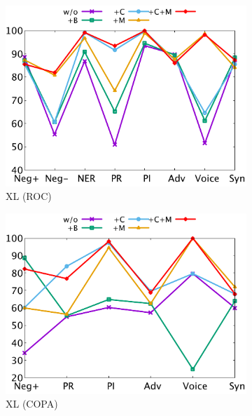\begin{figure}[th]
\begin{subfigure}[b]{0.24\textwidth}
\includegraphics[width=\columnwidth]{data/roc_xlnet.pdf}
\caption{XL (ROC)}
\label{fig:roc_xlnet}
\end{subfigure}
\hfill
\begin{subfigure}[b]{0.24\textwidth}
\centering
\includegraphics[width=\columnwidth]{data/copa_xlnet.pdf}
\caption{XL (COPA)}
\label{fig:copa_xlnet}
\end{subfigure}
\hfill
\begin{subfigure}[b]{0.24\textwidth}
\centering

\end{subfigure}
\end{figure}
